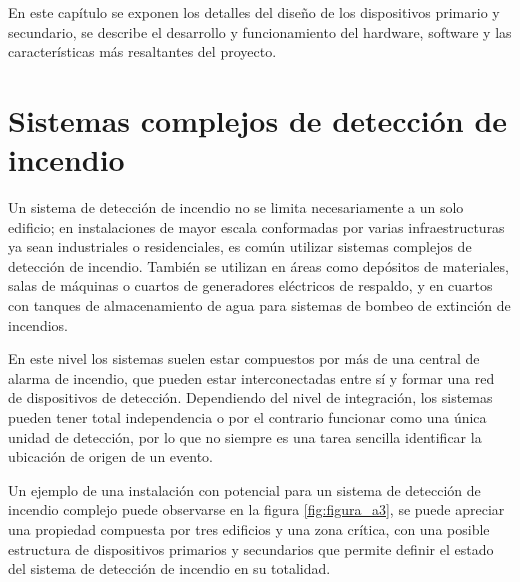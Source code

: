 
En este capítulo se exponen los detalles del diseño de los dispositivos primario y secundario, se describe el desarrollo y funcionamiento del hardware, software y las características más resaltantes del proyecto.

\section{Sistemas complejos de detección de incendio}

Un sistema de detección de incendio no se limita necesariamente a un solo edificio; en instalaciones de mayor escala conformadas por varias infraestructuras ya sean industriales o residenciales, es común utilizar sistemas complejos de detección de incendio. También se utilizan en áreas como depósitos de materiales, salas de máquinas o cuartos de generadores eléctricos de respaldo, y en cuartos con tanques de almacenamiento de agua para sistemas de bombeo de extinción de incendios.

En este nivel los sistemas suelen estar compuestos por más de una central de alarma de incendio, que pueden estar interconectadas entre sí y formar una red de dispositivos de detección. Dependiendo del nivel de integración, los sistemas pueden tener total independencia o por el contrario funcionar como una única unidad de detección, por lo que  no siempre es una tarea sencilla identificar la ubicación de origen de un evento.

Un ejemplo de una instalación con potencial para un sistema de detección de incendio complejo puede observarse en la figura \ref{fig:figura_a3}, se puede apreciar una propiedad compuesta por tres edificios y una zona crítica, con una posible estructura de dispositivos primarios y secundarios que permite definir el estado del sistema de detección de incendio en su totalidad.


